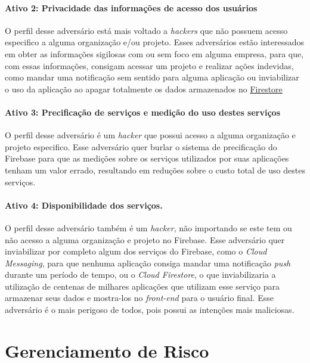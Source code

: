 \documentclass[
    openany,
    12pt,               %
    twoside,            %
    a4paper,            %
    english,            %
    brazil,             %
    ]{abntex2}
\begin{document}
\subsubsection{Ativo 2: Privacidade das informações de acesso dos usuários}
\label{cap:privacidade-informacoes}

O perfil desse adversário está mais voltado a \textit{hackers} que não possuem acesso especifico a alguma organização e/ou projeto. Esses adversários estão interessados em obter as informações sigilosas com ou sem foco em alguma empresa, para que, com essas informações, consigam acessar um projeto e realizar ações indevidas, como mandar uma notificação sem sentido para alguma aplicação ou inviabilizar o uso da aplicação ao apagar totalmente os dados armazenados no \href{https://firebase.google.com/docs/firestore}{Firestore}

\subsubsection{Ativo 3: Precificação de serviços e medição do uso destes serviços}
\label{cap:precificacao-servicos}

O perfil desse adversário é um \textit{hacker} que possui acesso a alguma organização e projeto especifico.
Esse adversário quer burlar o sistema de precificação do Firebase para que as medições sobre os serviços utilizados por suas aplicações tenham um valor errado, resultando em reduções sobre o custo total de uso destes serviços.

\subsubsection{Ativo 4: Disponibilidade dos serviços.}
\label{cap:disponibilidade-servicos}

O perfil desse adversário também é um \textit{hacker}, não importando se este tem ou não acesso a alguma organização e projeto no Firebase. Esse adversário quer inviabilizar por completo algum dos serviços do Firebase, como o \textit{Cloud Messaging}, para que nenhuma aplicação consiga mandar uma notificação \textit{push} durante um período de tempo, ou o \textit{Cloud Firestore}, o que inviabilizaria a utilização de centenas de milhares aplicações que utilizam esse serviço para armazenar seus dados e mostra-los no \textit{front-end} para o usuário final. Esse adversário é o mais perigoso de todos, pois possui as intenções mais maliciosas.

\chapter{Gerenciamento de Risco}
\label{cap:gerenciamento-risco}
\end{document}
